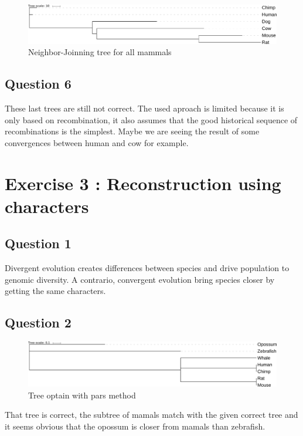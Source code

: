 \documentclass[]{article}
\begin{document}
\begin{figure}[h!]
	\includegraphics*[width = \linewidth]{../files/NJ.pdf}
	\caption{\label{nj2} Neighbor-Joinning tree for all mammals }
\end{figure}

\subsection{Question 6}
These last trees are still not correct. The used aproach is limited because it is only based on recombination, it also assumes that the good historical sequence of recombinations is the simplest. Maybe we are seeing the result of some convergences between human and cow for example.

\section{Exercise 3 : Reconstruction using characters}
\subsection{Question 1}
Divergent evolution creates differences between species and drive population to genomic diversity.
 A contrario, convergent evolution bring species closer by getting the same characters.
\subsection{Question 2}

\begin{figure}[h!]
	\includegraphics*[width = \linewidth]{../ex3/PARS.pdf}
	\caption{Tree optain with pars method }
\end{figure}
That tree is correct, the subtree of mamals match with the given correct tree and it seems obvious that the opossum is closer from mamals than zebrafish.
\end{document}
